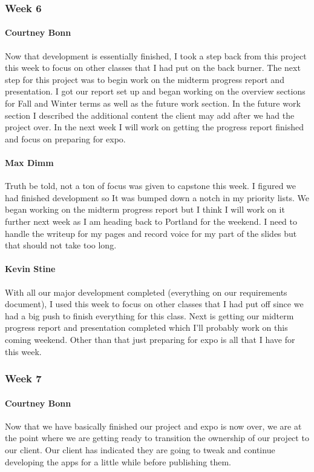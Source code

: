 		\subsubsection{Week 6}

			\paragraph{Courtney Bonn}
			Now that development is essentially finished, I took a step back from this project this week to focus on other classes that I had put on the back burner. The next step for this project was to begin work on the midterm progress report and presentation. I got our report set up and began working on the overview sections for Fall and Winter terms as well as the future work section. In the future work section I described the additional content the client may add after we had the project over. In the next week I will work on getting the progress report finished and focus on preparing for expo.

			\paragraph{Max Dimm}
			Truth be told, not a ton of focus was given to capstone this week. I figured we had finished development so It was bumped down a notch in my priority lists. We began working on the midterm progress report but I think I will work on it further next week as I am heading back to Portland for the weekend. I need to handle the writeup for my pages and record voice for my part of the slides but that should not take too long.

			\paragraph{Kevin Stine}
			With all our major development completed (everything on our requirements document), I used this week to focus on other classes that I had put off since we had a big push to finish everything for this class. Next is getting our midterm progress report and presentation completed which I'll probably work on this coming weekend. Other than that just preparing for expo is all that I have for this week.

		\subsubsection{Week 7}

			\paragraph{Courtney Bonn}
			Now that we have basically finished our project and expo is now over, we are at the point where we are getting ready to transition the ownership of our project to our client. Our client has indicated they are going to tweak and continue developing the apps for a little while before publishing them.


